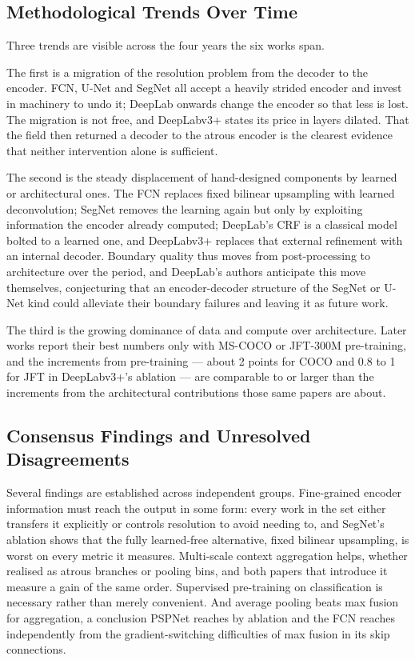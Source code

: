 \documentclass[journal]{IEEEtran}
\begin{document}
\subsection{Methodological Trends Over Time}

Three trends are visible across the four years the six works span.

The first is a migration of the resolution problem from the decoder to the encoder.
FCN, U-Net and SegNet all accept a heavily strided encoder and invest in machinery to
undo it; DeepLab onwards change the encoder so that less is lost. The migration is
not free, and DeepLabv3+ states its price in layers dilated. That the field then
returned a decoder to the atrous encoder is the clearest evidence that neither
intervention alone is sufficient.

The second is the steady displacement of hand-designed components by learned or
architectural ones. The FCN replaces fixed bilinear upsampling with learned
deconvolution; SegNet removes the learning again but only by exploiting information
the encoder already computed; DeepLab's CRF is a classical model bolted to a learned
one, and DeepLabv3+ replaces that external refinement with an internal decoder.
Boundary quality thus moves from post-processing to architecture over the period, and
DeepLab's authors anticipate this move themselves, conjecturing that an
encoder-decoder structure of the SegNet or U-Net kind could alleviate their boundary
failures and leaving it as future work.

The third is the growing dominance of data and compute over architecture. Later works
report their best numbers only with MS-COCO or JFT-300M pre-training, and the
increments from pre-training --- about 2 points for COCO and 0.8 to 1 for JFT in
DeepLabv3+'s ablation --- are comparable to or larger than the increments from the
architectural contributions those same papers are about.

\subsection{Consensus Findings and Unresolved Disagreements}
\label{subsec:disagree}

Several findings are established across independent groups. Fine-grained encoder
information must reach the output in some form: every work in the set either
transfers it explicitly or controls resolution to avoid needing to, and SegNet's
ablation shows that the fully learned-free alternative, fixed bilinear upsampling,
is worst on every metric it measures. Multi-scale context aggregation helps, whether
realised as atrous branches or pooling bins, and both papers that introduce it measure
a gain of the same order. Supervised pre-training on classification is necessary rather
than merely convenient. And average pooling beats max fusion for aggregation, a
conclusion PSPNet reaches by ablation and the FCN reaches independently from the
gradient-switching difficulties of max fusion in its skip connections.
\end{document}
